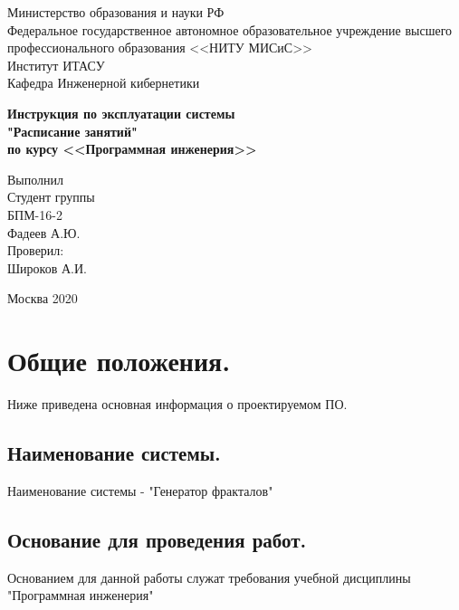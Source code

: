 \documentclass[a4paper,12pt,preview]{report} %
\begin{document}
	
	\begin{center}
		Министерство образования и науки РФ \\
		Федеральное государственное автономное образовательное учреждение высшего профессионального образования <<НИТУ МИСиС>>\\
		Институт ИТАСУ\\
		Кафедра Инженерной кибернетики\\
	\end{center}
	
	
	\vfill
	
	\begin{center}
		\Large\textbf{Инструкция по эксплуатации системы\\ "Расписание занятий" \\
			по курсу <<Программная инженерия>>}
	\end{center}
	
	\vfill
	
	\begin{FlushRight}
		Выполнил\\
		Студент группы \\
		БПМ-16-2 \\
		Фадеев А.Ю. \\
		[\baselineskip]
		Проверил: \\
		Широков А.И. \\
		[9\baselineskip]
	\end{FlushRight}
	
	
	\begin{center}
		Москва 2020
	\end{center}
	
	\thispagestyle{empty}
	\newpage
	
	\tableofcontents
	\newpage
	
	\section{Общие положения.}
	
	Ниже приведена основная информация о проектируемом ПО.
	
	\subsection{Наименование системы.}
	Наименование системы - "Генератор фракталов"
	
	\subsection{Основание для проведения работ.}
	Основанием для данной работы служат требования учебной дисциплины "Программная инженерия"
	
\end{document}
